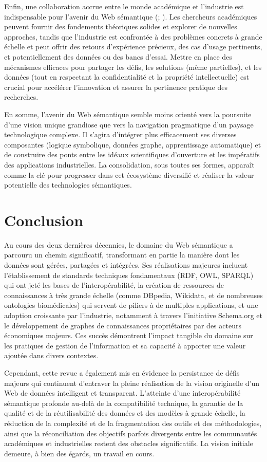 \documentclass[9pt,twocolumn,twoside,french]{opticajnl}
\begin{document}
Enfin, une collaboration accrue entre le monde académique et l'industrie est indispensable pour l'avenir du Web sémantique (\citealp{Noy2019Industryscale}; \citealp{Hitzler2021}). Les chercheurs académiques peuvent fournir des fondements théoriques solides et explorer de nouvelles approches, tandis que l'industrie est confrontée à des problèmes concrets à grande échelle et peut offrir des retours d'expérience précieux, des cas d'usage pertinents, et potentiellement des données ou des bancs d'essai. Mettre en place des mécanismes efficaces pour partager les défis, les solutions (même partielles), et les données (tout en respectant la confidentialité et la propriété intellectuelle) est crucial pour accélérer l'innovation et assurer la pertinence pratique des recherches.

En somme, l'avenir du Web sémantique semble moins orienté vers la poursuite d'une vision unique grandiose que vers la navigation pragmatique d'un paysage technologique complexe. Il s'agira d'intégrer plus efficacement ses diverses composantes (logique symbolique, données graphe, apprentissage automatique) et de construire des ponts entre les idéaux scientifiques d'ouverture et les impératifs des applications industrielles. La consolidation, sous toutes ses formes, apparaît comme la clé pour progresser dans cet écosystème diversifié et réaliser la valeur potentielle des technologies sémantiques.
\section{Conclusion}
Au cours des deux dernières décennies, le domaine du Web sémantique a parcouru un chemin significatif, transformant en partie la manière dont les données sont gérées, partagées et intégrées. Ses réalisations majeures incluent l'établissement de standards techniques fondamentaux (RDF, OWL, SPARQL) qui ont jeté les bases de l'interopérabilité, la création de ressources de connaissances à très grande échelle (comme DBpedia, Wikidata, et de nombreuses ontologies biomédicales) qui servent de piliers à de multiples applications, et une adoption croissante par l'industrie, notamment à travers l'initiative Schema.org et le développement de graphes de connaissances propriétaires par des acteurs économiques majeurs. Ces succès démontrent l'impact tangible du domaine sur les pratiques de gestion de l'information et sa capacité à apporter une valeur ajoutée dans divers contextes.

Cependant, cette revue a également mis en évidence la persistance de défis majeurs qui continuent d'entraver la pleine réalisation de la vision originelle d'un Web de données intelligent et transparent. L'atteinte d'une interopérabilité sémantique profonde au-delà de la compatibilité technique, la garantie de la qualité et de la réutilisabilité des données et des modèles à grande échelle, la réduction de la complexité et de la fragmentation des outils et des méthodologies, ainsi que la réconciliation des objectifs parfois divergents entre les communautés académiques et industrielles restent des obstacles significatifs. La vision initiale demeure, à bien des égards, un travail en cours.
\end{document}
